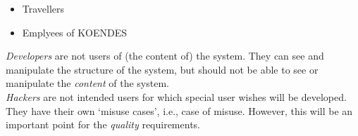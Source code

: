 \begin{itemize}
\item Travellers
\item Emplyees of KOENDES
\end{itemize}
\textit{Developers} are not users of (the content of) the system. They can see and manipulate 
the structure of the system, but should not be able to see or manipulate the \textit{content} of the system.\\
\textit{Hackers} are not intended users for which special user wishes will be developed. They have 
their own ‘misuse cases’, i.e., case of misuse. However, this will be an important point for the \textit{quality} requirements.